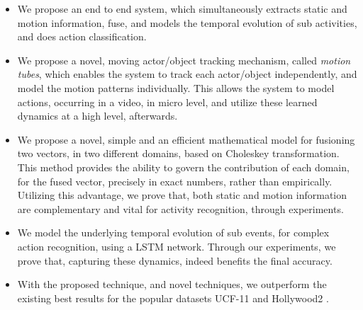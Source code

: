  \begin{itemize}
  \item We propose an end to end system, which simultaneously extracts static and motion information, fuse, and models the 
temporal evolution of sub activities, and does action classification. 
  \item We propose a novel, moving actor/object tracking mechanism, called \textit{motion tubes},
which enables the system to track each actor/object independently, and model the motion patterns individually. 
This allows the system to model actions, occurring in a video, in micro level, and utilize these learned dynamics
at a high level, afterwards.
 \item We propose a novel, simple and an efficient mathematical model for fusioning two vectors, 
in two different 
domains, based on Choleskey transformation. This method provides the ability to govern the contribution of each domain,
for the fused vector, precisely in exact numbers, rather than empirically. Utilizing this advantage, we prove that,
both static and motion information are complementary and vital for activity recognition, through experiments.
  \item We model the underlying 
temporal evolution of sub events, for complex action recognition, using a LSTM network. Through our experiments,
we prove that, capturing these dynamics, indeed benefits the final accuracy. 
\item With the proposed technique, and novel techniques,
we outperform the existing best results for the popular datasets UCF-11 \cite{liu2009recognizing}
and Hollywood2 \cite{marszalek2009actions}.
 \end{itemize}




